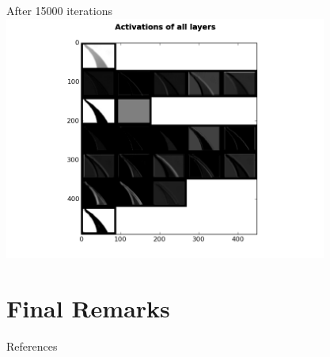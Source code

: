 \begin{frame}{After 15000 iterations}
\includegraphics[height=8.0cm]{data/activations/output-15000.png}\\ 
\end{frame}

\section*{Final Remarks}
\begin{frame}{References}
\nocite{GoBeCo16}

\tiny

\end{frame}


